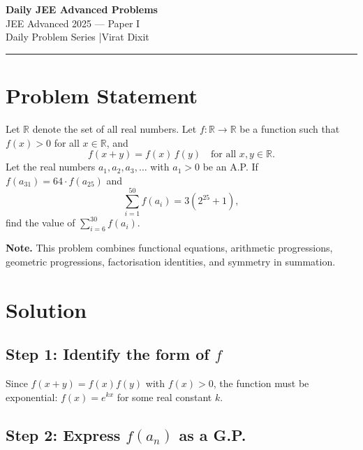 \documentclass[12pt]{article}
\begin{document}
\begin{center}
  {\LARGE\bfseries Daily JEE Advanced Problems}\\[4pt]
  {\large JEE Advanced 2025 --- Paper I}\\[2pt]
  {\small\color{gray} Daily Problem Series \quad|\quad Virat Dixit}
\end{center}

\vspace{4pt}
\noindent\rule{\linewidth}{0.8pt}
\vspace{4pt}

\section*{Problem Statement}

Let $\mathbb{R}$ denote the set of all real numbers. Let $f:\mathbb{R}\to\mathbb{R}$ be a function
such that $f(x)>0$ for all $x\in\mathbb{R}$, and
\[
  f(x+y)=f(x)\,f(y)\quad\text{for all }x,y\in\mathbb{R}.
\]
Let the real numbers $a_1,a_2,a_3,\ldots$ with $a_1>0$ be an A.P.
If $f(a_{31})=64\cdot f(a_{25})$ and
\[
  \sum_{i=1}^{50}f(a_i)=3\!\left(2^{25}+1\right),
\]
find the value of $\displaystyle\sum_{i=6}^{30}f(a_i)$.

\vspace{6pt}
\begin{mdframed}[backgroundcolor=boxgray, linecolor=noteblue, linewidth=0.8pt,
                 innertopmargin=5pt, innerbottommargin=5pt,
                 innerleftmargin=8pt, innerrightmargin=8pt,
                 skipabove=4pt, skipbelow=4pt]
\textbf{\color{noteblue}Note.} This problem combines functional equations, arithmetic progressions,
geometric progressions, factorisation identities, and symmetry in summation.
\end{mdframed}

\section*{Solution}

\subsection*{Step 1: Identify the form of $f$}

Since $f(x+y)=f(x)f(y)$ with $f(x)>0$, the function must be exponential:
$f(x)=e^{kx}$ for some real constant $k$.

\subsection*{Step 2: Express $f(a_n)$ as a G.P.}
\end{document}
